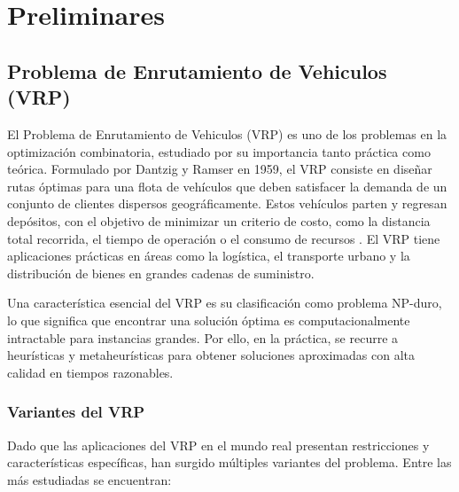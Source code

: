 \documentclass[12pt]{article}
\begin{document}
\section{Preliminares}
\subsection{Problema de Enrutamiento de Vehiculos (VRP)}
El Problema de Enrutamiento de Vehiculos (VRP) es uno de los problemas  en la optimización combinatoria,  estudiado por su importancia tanto práctica como teórica. Formulado por Dantzig y Ramser en 1959, el VRP consiste en diseñar rutas óptimas para una flota de vehículos que deben satisfacer la demanda de un conjunto de clientes dispersos geográficamente. Estos vehículos parten y regresan  depósitos, con el objetivo de minimizar un criterio de costo, como la distancia total recorrida, el tiempo de operación o el consumo de recursos \cite{ref3}. El VRP tiene aplicaciones prácticas en áreas como la logística, el transporte urbano y la distribución de bienes en grandes cadenas de suministro.

Una característica esencial del VRP es su clasificación como problema NP-duro, lo que significa que encontrar una solución óptima es computacionalmente intractable para instancias grandes. Por ello, en la práctica, se recurre a heurísticas y metaheurísticas para obtener soluciones aproximadas con alta calidad en tiempos razonables.


\subsubsection{Variantes del VRP}

Dado que las aplicaciones del VRP en el mundo real presentan restricciones y características específicas, han surgido múltiples variantes del problema. Entre las más estudiadas se encuentran:
\end{document}
